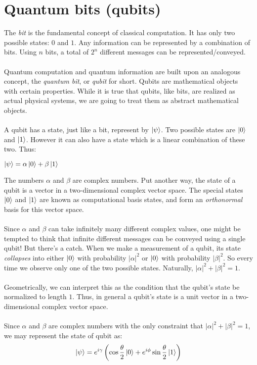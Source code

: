 \section{Quantum bits (qubits)}

The \textit{bit} is the fundamental concept of classical computation. It has only two possible states: $0$ and $1$. Any information can be represented by a combination of bits. Using $n$ bits, a total of $2^n$ different messages can be represented/conveyed.
\\\\
Quantum computation and quantum information are built upon an analogous concept, the \textit{quantum bit}, or \textit{qubit} for short. Qubits are mathematical objects with certain properties. While it is true that qubits, like bits, are realized as actual physical systems, we are going to treat them as abstract mathematical objects.
\\\\
A qubit has a state, just like a bit, represent by $\ket{\psi}$. Two possible states are $\ket{0}$ and $\ket{1}$. However it can also have a state which is a linear combination of these two. Thus:
\begin{center}
    $\ket{\psi}=\alpha\ket{0} + \beta\ket{1}$
\end{center}

The numbers $\alpha$ and $\beta$ are complex numbers. Put another way, the state of a qubit is a vector in a two-dimensional complex vector space. The special states $\ket{0}$ and $\ket{1}$ are known as computational basis states, and form an \textit{orthonormal} basis for this vector space.
\\\\
Since $\alpha$ and $\beta$ can take infinitely many different complex values, one might be tempted to think that infinite different messages can be conveyed using a single qubit! But there's a catch. When we make a measurement of a qubit, its state \textit{collapses} into either $\ket{0}$ with probability $|\alpha|^2$ or $\ket{0}$ with probability $|\beta|^2$. So every time we observe only one of the two possible states. Naturally, $|\alpha|^2 + |\beta|^2 = 1$. 
\\\\
Geometrically, we can interpret this as the condition that the qubit’s state be normalized to length $1$. Thus, in general a qubit’s state is a unit vector in a two-dimensional complex vector space.
\\\\
Since $\alpha$ and $\beta$ are complex numbers with the only constraint that $|\alpha|^2 + |\beta|^2 = 1$, we may represent the state of qubit as:
    $$\ket{\psi} = e^{i\gamma}\left(\cos{\frac{\theta}{2}}\ket{0} + e^{i\phi}\sin{\frac{\theta}{2}}\ket{1}\right)$$

